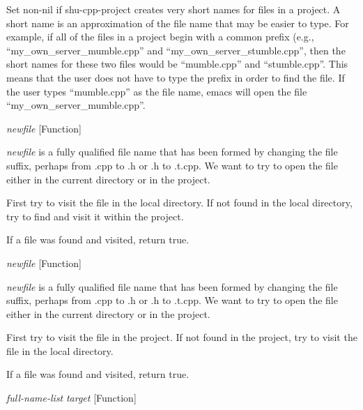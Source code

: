\begin{doc-string}
Set non-nil if shu-cpp-project creates very short names for files in a
project.  A short name is an approximation of the file name that may be easier
to type.  For example, if all of the files in a project begin with a common
prefix (e.g., ``my\_own\_server\_mumble.cpp'' and ``my\_own\_server\_stumble.cpp'',
then the short names for these two files would be ``mumble.cpp'' and
``stumble.cpp''.  This means that the user does not have to type the prefix in
order to find the file.  If the user types ``mumble.cpp'' as the file name,
emacs will open the file ``my\_own\_server\_mumble.cpp''.
\end{doc-string}

\vspace{1em}
\noindent
{}
\usebox{\funcname}\emph{newfile}
 \hfill [Function]

\begin{doc-string}
\emph{newfile} is a fully qualified file name that has been formed by changing the
file suffix, perhaps from .cpp to .h or .h to .t.cpp.  We want to try to open
the file either in the current directory or in the project.

First try to visit the file in the local directory.  If not found in the local
directory, try to find and visit it within the project.

If a file was found and visited, return true.
\end{doc-string}

\vspace{1em}
\noindent
{}
\usebox{\funcname}\emph{newfile}
 \hfill [Function]

\begin{doc-string}
\emph{newfile} is a fully qualified file name that has been formed by changing the
file suffix, perhaps from .cpp to .h or .h to .t.cpp.  We want to try to open
the file either in the current directory or in the project.

First try to visit the file in the project.  If not found in the project, try to
visit the file in the local directory.

If a file was found and visited, return true.
\end{doc-string}

\vspace{1em}
\noindent
{}
\usebox{\funcname}\emph{full-name-list} \emph{target}
 \hfill [Function]

